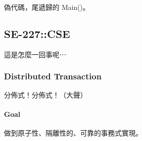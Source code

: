 \documentclass[
]{article}
\begin{document}
偽代碼，尾遞歸的 Main()。

\hypertarget{header-n92}{%
\subsection{SE-227::CSE}\label{header-n92}}

這是怎麼一回事呢⋯

\hypertarget{header-n94}{%
\subsubsection{Distributed Transaction}\label{header-n94}}

分佈式！分佈式！（大聲）

\hypertarget{header-n96}{%
\paragraph{Goal}\label{header-n96}}

做到原子性、隔離性的、可靠的事務式實現。
\end{document}
